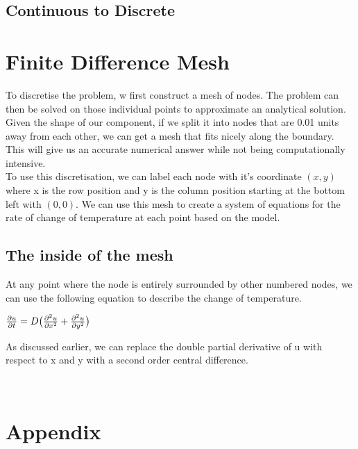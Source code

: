 \documentclass[12pt,a4paper]{article}
\begin{document}
\subsection{Continuous to Discrete}
\clearpage

\section{Finite Difference Mesh}
To discretise the problem, w first construct a mesh of nodes. The problem can then be solved on those individual points to approximate an analytical solution. Given the shape of our component, if we split it into nodes that are 0.01 units away from each other, we can get a mesh that fits nicely along the boundary. This will give us an accurate numerical answer while not being computationally intensive. 
\\
To use this discretisation, we can label each node with it's coordinate $(x,y)$ where x is the row position and y is the column position starting at the bottom left with $(0,0)$. We can use this mesh to create a system of equations for the rate of change of temperature at each point based on the model.
\subsection{The inside of the mesh}
At any point where the node is entirely surrounded by other numbered nodes, we can use the following equation to describe the change of temperature.
\begin{center}
$\frac{\partial u}{\partial t}=D\big{(}\frac{\partial^2 u}{\partial x^2}+\frac{\partial^2 u}{\partial y^2}\big{)}$
\end{center}
As discussed earlier, we can replace the double partial derivative of u with respect to x and y with a second order central difference. %
\begin{center}
$$
\end{center}


\clearpage
\section{Appendix}
\end{document}
